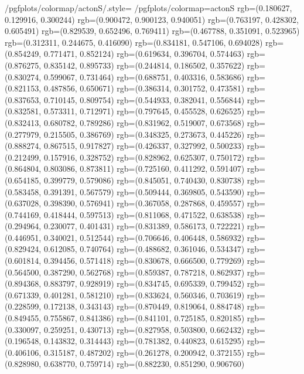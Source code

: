 {%
		/pgfplots/colormap/actonS/.style={
			/pgfplots/colormap={actonS}{%
					rgb=(0.180627, 0.129916, 0.300244)
					rgb=(0.900472, 0.900123, 0.940051)
					rgb=(0.763197, 0.428302, 0.605491)
					rgb=(0.829539, 0.652496, 0.769411)
					rgb=(0.467788, 0.351091, 0.523965)
					rgb=(0.312311, 0.244675, 0.416090)
					rgb=(0.834181, 0.547106, 0.694028)
					rgb=(0.854249, 0.771471, 0.852124)
					rgb=(0.619634, 0.396704, 0.574463)
					rgb=(0.876275, 0.835142, 0.895733)
					rgb=(0.244814, 0.186502, 0.357622)
					rgb=(0.830274, 0.599067, 0.731464)
					rgb=(0.688751, 0.403316, 0.583686)
					rgb=(0.821153, 0.487856, 0.650671)
					rgb=(0.386314, 0.301752, 0.473581)
					rgb=(0.837653, 0.710145, 0.809754)
					rgb=(0.544933, 0.382041, 0.556844)
					rgb=(0.832581, 0.573311, 0.712971)
					rgb=(0.797645, 0.455528, 0.626525)
					rgb=(0.832413, 0.680782, 0.789286)
					rgb=(0.831962, 0.519007, 0.673568)
					rgb=(0.277979, 0.215505, 0.386769)
					rgb=(0.348325, 0.273673, 0.445226)
					rgb=(0.888274, 0.867515, 0.917827)
					rgb=(0.426337, 0.327992, 0.500233)
					rgb=(0.212499, 0.157916, 0.328752)
					rgb=(0.828962, 0.625307, 0.750172)
					rgb=(0.864804, 0.803086, 0.873811)
					rgb=(0.725160, 0.411292, 0.591407)
					rgb=(0.654185, 0.399779, 0.579086)
					rgb=(0.845051, 0.740430, 0.830738)
					rgb=(0.583458, 0.391391, 0.567579)
					rgb=(0.509444, 0.369805, 0.543590)
					rgb=(0.637028, 0.398390, 0.576941)
					rgb=(0.367058, 0.287868, 0.459557)
					rgb=(0.744169, 0.418444, 0.597513)
					rgb=(0.811068, 0.471522, 0.638538)
					rgb=(0.294964, 0.230077, 0.401431)
					rgb=(0.831389, 0.586173, 0.722221)
					rgb=(0.446951, 0.340021, 0.512544)
					rgb=(0.706646, 0.406448, 0.586932)
					rgb=(0.829424, 0.612085, 0.740764)
					rgb=(0.488682, 0.361046, 0.534347)
					rgb=(0.601814, 0.394456, 0.571418)
					rgb=(0.830678, 0.666500, 0.779269)
					rgb=(0.564500, 0.387290, 0.562768)
					rgb=(0.859387, 0.787218, 0.862937)
					rgb=(0.894368, 0.883797, 0.928919)
					rgb=(0.834745, 0.695339, 0.799452)
					rgb=(0.671339, 0.401281, 0.581210)
					rgb=(0.833624, 0.560346, 0.703619)
					rgb=(0.228599, 0.172138, 0.343143)
					rgb=(0.870449, 0.819064, 0.884748)
					rgb=(0.849455, 0.755867, 0.841386)
					rgb=(0.841101, 0.725185, 0.820185)
					rgb=(0.330097, 0.259251, 0.430713)
					rgb=(0.827958, 0.503800, 0.662432)
					rgb=(0.196548, 0.143832, 0.314443)
					rgb=(0.781382, 0.440823, 0.615295)
					rgb=(0.406106, 0.315187, 0.487202)
					rgb=(0.261278, 0.200942, 0.372155)
					rgb=(0.828980, 0.638770, 0.759714)
					rgb=(0.882230, 0.851290, 0.906760)
}}}
